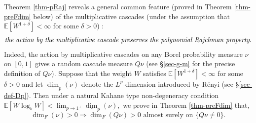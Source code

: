 \documentclass[12pt]{amsart}
\theoremstyle{definition}
\theoremstyle{remark}
\newcommand{\E}{\mathbb{E}}
\newcommand{\ldim}{\underline{\dim}}
\numberwithin{equation}{section}
\begin{document}
Theorem \ref{thm-pRaj}  reveals a  general common feature (proved in Theorem \ref{thm-preFdim} below) of the multiplicative  cascades (under the assumption that $\E[W^{1+\delta}]<\infty$ for some $\delta>0$) :
\[
\text{\it the action by the multiplicative cascade preserves the polynomial Rajchman property}. 
\]
Indeed,   the action by  multiplicative cascades on any Borel probability measure $\nu$ on $[0,1]$ gives a random cascade measure  $Q\nu$ (see \S \ref{sec-g-m} for the precise definition of $Q\nu$).    Suppose that the weight $W$ satisfies $\E[W^{1+\delta}]<\infty$ for some $\delta>0$ and  let $\ldim_{p}(\nu)$ denote the $L^p$-dimension introduced by R\'enyi \cite{Renyi} (see \S \ref{sec-def-Dp}).  Then  under a natural Kahane type non-degeneracy condition  
$
 \E[W\log_b W]< \lim_{p\to 1^{+}} \ldim_{p}(\nu), 
$ 
  we prove  in Theorem \ref{thm-preFdim} that, 
$$
\dim_F(\nu)>0   \Longrightarrow  \text{$\dim_F(Q\nu)> 0$ almost surely on $\{Q\nu\ne 0\}$}. 
$$
 
\end{document}
